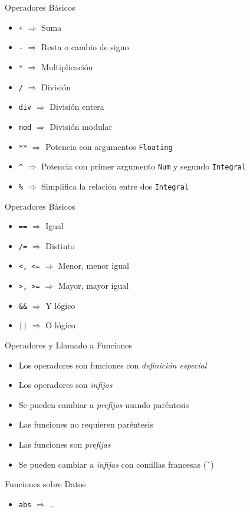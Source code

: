 \begin{frame}[fragile]{Operadores Básicos}
    \begin{itemize}
        \item \verb|+| $\Rightarrow$ Suma
        \item \verb|-| $\Rightarrow$ Resta o cambio de signo
        \item \verb|*| $\Rightarrow$ Multiplicación
        \item \verb|/| $\Rightarrow$ División
        \item \verb|div| $\Rightarrow$ División entera
        \item \verb|mod| $\Rightarrow$ División modular
        \item \verb|**| $\Rightarrow$ Potencia con argumentos \verb|Floating|
        \item \verb|^| $\Rightarrow$ Potencia con primer argumento \verb|Num| y segundo \verb|Integral|
        \item \verb|%| $\Rightarrow$ Simplifica la relación entre dos \verb|Integral|
    \end{itemize}
\end{frame}

\begin{frame}[fragile]{Operadores Básicos}
    \begin{itemize}
        \item \verb|==| $\Rightarrow$ Igual
        \item \verb|/=| $\Rightarrow$ Distinto
        \item \verb|<, <=| $\Rightarrow$ Menor, menor igual
        \item \verb|>, >=| $\Rightarrow$ Mayor, mayor igual
        \item \verb|&&| $\Rightarrow$ Y lógico
        \item \verb_||_ $\Rightarrow$ O lógico
    \end{itemize}
\end{frame}

\begin{frame}[fragile]{Operadores y Llamado a Funciones}
    \begin{itemize}
        \item Los operadores son funciones con \emph{definición especial}
        \item Los operadores son \emph{infijos}
        \item Se pueden cambiar a \emph{prefijos} usando paréntesis
        \item Las funciones no requieren paréntesis
        \item Las funciones son \emph{prefijas}
        \item Se pueden cambiar a \emph{infijas} con comillas francesas (\verb|`|)
    \end{itemize}
\end{frame}

\begin{frame}[fragile]{Funciones sobre Datos}
    \begin{itemize}
        \item \verb|abs| $\Rightarrow$ \dots
    \end{itemize}
\end{frame}

